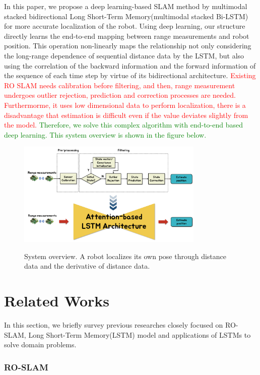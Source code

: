 \documentclass[letterpaper, 10 pt, conference]{ieeeconf}  %
\begin{document}
 In this paper, we propose a deep learning-based SLAM method by multimodal stacked bidirectional Long Short-Term Memory(multimodal stacked Bi-LSTM) for more accurate localization of the robot. Using deep learning, our structure directly learns the end-to-end mapping between range measurements and robot position. This operation non-linearly maps the relationship not only considering the long-range dependence of sequential distance data by the LSTM, but also using the correlation of the backward information and the forward information of the sequence of each time step by virtue of its bidirectional architecture. \textcolor{red}{Existing RO SLAM needs calibration before filtering, and then, range measurement undergoes outlier rejection, prediction and correction processes are needed.	Furthermorme, it uses low dimensional data to perform localization, there is a disadvantage that estimation is difficult even if the value deviates slightly from the model.} \textcolor{green}{Therefore, we solve this complex algorithm with end-to-end based deep learning. This system overview is shown in the figure below.}
 
\begin{figure}[h]
	
	\centering
	\includegraphics[height=5cm]{CE554_traditional_to_RNN}
	\label{fig:example}
	\caption{System overview. A robot localizes its own pose through distance data and the derivative of distance data. }
	
\end{figure}

\section{Related Works}

In this section, we briefly survey previous researches closely focused on 
RO-SLAM, Long Short-Term Memory(LSTM) model and applications of LSTMs to solve domain problems.

\subsubsection{RO-SLAM}
\end{document}
